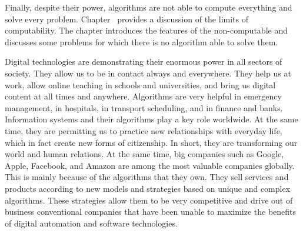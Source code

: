 Finally, despite their power, algorithms are not able to compute everything and solve every problem. Chapter~ provides a discussion of the limits of computability. The chapter introduces the features of the non-computable and discusses some problems for which there is no algorithm able to solve them.

Digital technologies are demonstrating their enormous power in all sectors of society. They allow us to be in contact always and everywhere. They help us at work, allow online teaching in schools and universities, and bring us digital content at all times and anywhere. Algorithms are very helpful in emergency management, in hospitals, in transport scheduling, and in finance and banks. Information \hbox{systems} and their algorithms play a key role worldwide. At the same time, they are permitting us to practice new relationships with everyday life, which in fact create new forms of citizenship. In short, they are transforming our world and human relations. At the same time, big companies such as Google, Apple, Facebook, and Amazon are among the most valuable companies globally. This is mainly because of the algorithms that they own. They sell services and products according to new models and strategies based on unique and complex algorithms. These strategies allow them to be very competitive and drive out of business conventional companies that have been unable to maximize the benefits of digital automation and software technologies.

